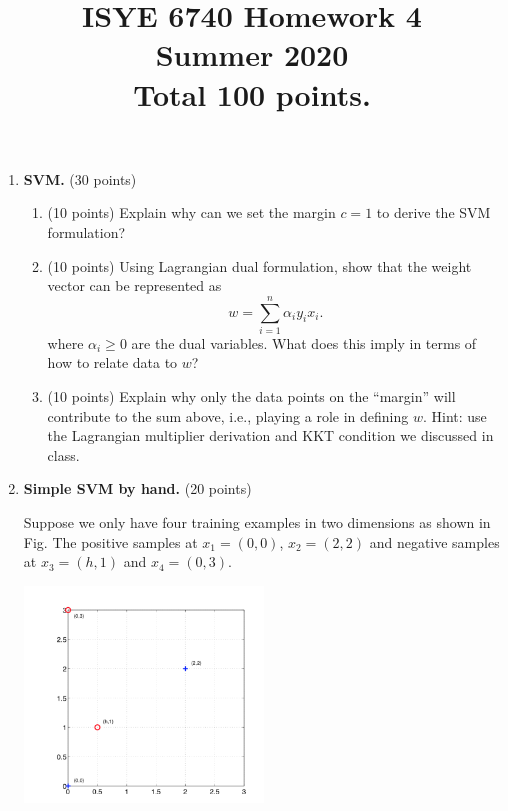 \documentclass[twoside,10pt]{article}
\begin{document}
\title{ISYE 6740 Homework 4\\ 
Summer 2020\\
\small Total 100 points.}
\date{}
\maketitle







\begin{enumerate}


\item{\bf SVM. } (30 points)

\begin{enumerate}
\item (10 points) Explain why can we set the margin $c = 1$ to derive the SVM formulation?
\item (10 points) Using Lagrangian dual formulation, show that the weight vector can be represented as
\[
w = \sum_{i=1}^n \alpha_i y_i x_i.
\]
where $\alpha_i \geq 0$ are the dual variables. What does this imply in terms of how to relate data to $w$?
\item (10 points) Explain why only the data points on the ``margin'' will contribute to the sum above, i.e., playing a role in defining $w$. Hint: use the Lagrangian multiplier derivation and KKT condition we discussed in class. 

\end{enumerate}



\item{\bf  Simple SVM by hand.} (20 points)

Suppose we only have four training examples in two dimensions as shown in Fig. The positive samples at $x_1 = (0, 0)$, $x_2 = (2, 2)$ and negative samples at $x_3 = (h, 1)$ and $x_4 = (0, 3)$. 
%
\begin{center}
\includegraphics[width = 0.5\textwidth]{svm}
\end{center}


\end{enumerate}
\end{document}
